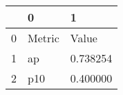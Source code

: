 \begin{tabular}{lll}
\toprule
 & 0 & 1 \\
\midrule
0 & Metric & Value \\
1 & ap & 0.738254 \\
2 & p10 & 0.400000 \\
\bottomrule
\end{tabular}
